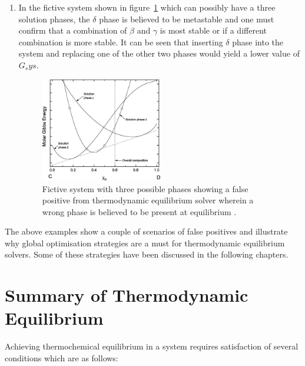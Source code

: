 \begin{enumerate}
	\item In the fictive system shown in figure~\ref{fig:go2} which can possibly have a three solution phases, the $\delta$ phase is  believed to be metastable and one must confirm that a combination of $\beta$ and $\gamma$ is most stable or if a different combination is more stable. It can be seen that inserting $\delta$ phase into the system and replacing one of the other two phases would yield a lower value of $G_sys$.
		\begin{figure}[htbp]
		\centering
		\includegraphics[width=0.5\textwidth]{figures/Global_opt2}
		\caption{Fictive system with three possible phases showing a false positive from thermodynamic equilibrium solver wherein a wrong phase is believed to be present at equilibrium \cite{Piro16}.}
		\label{fig:go2}
	\end{figure}
	\end{enumerate}

The above examples show a couple of scenarios of false positives and illustrate why global optimisation strategies are a must for thermodynamic equilibrium solvers. Some of these strategies have been discussed in the following chapters.

\section{Summary of Thermodynamic Equilibrium}
Achieving thermochemical equilibrium in a system requires satisfaction of several conditions which are as follows:
